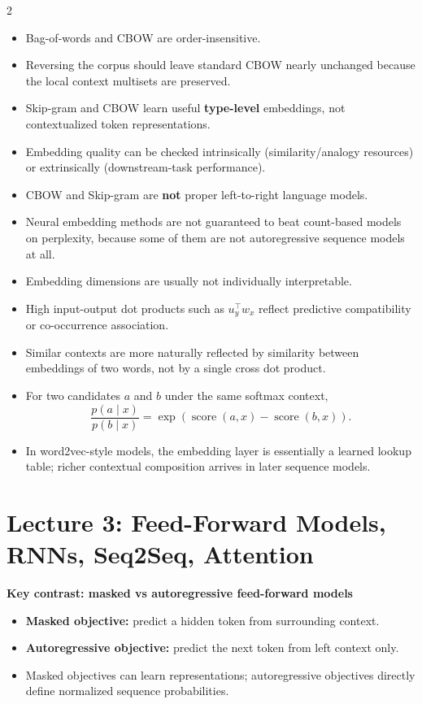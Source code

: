 \documentclass[10pt]{article}
\begin{document}
\begin{multicols*}{2}
\begin{itemize}
\item Bag-of-words and CBOW are order-insensitive.
\item Reversing the corpus should leave standard CBOW nearly unchanged because the local context multisets are preserved.
\item Skip-gram and CBOW learn useful \textbf{type-level} embeddings, not contextualized token representations.
\item Embedding quality can be checked intrinsically (similarity/analogy resources) or extrinsically (downstream-task performance).
\item CBOW and Skip-gram are \textbf{not} proper left-to-right language models.
\item Neural embedding methods are not guaranteed to beat count-based models on perplexity, because some of them are not autoregressive sequence models at all.
\item Embedding dimensions are usually not individually interpretable.
\item High input-output dot products such as \(u_y^\top w_x\) reflect predictive compatibility or co-occurrence association.
\item Similar contexts are more naturally reflected by similarity between embeddings of two words, not by a single cross dot product.
\item For two candidates \(a\) and \(b\) under the same softmax context,
\[
\frac{p(a \mid x)}{p(b \mid x)}=\exp(\operatorname{score}(a,x)-\operatorname{score}(b,x)).
\]
\item In word2vec-style models, the embedding layer is essentially a learned lookup table; richer contextual composition arrives in later sequence models.
\end{itemize}

\section*{Lecture 3: Feed-Forward Models, RNNs, Seq2Seq, Attention}
\textbf{Key contrast: masked vs autoregressive feed-forward models}
\begin{itemize}
\item \textbf{Masked objective:} predict a hidden token from surrounding context.
\item \textbf{Autoregressive objective:} predict the next token from left context only.
\item Masked objectives can learn representations; autoregressive objectives directly define normalized sequence probabilities.
\end{itemize}


\end{multicols*}
\end{document}
